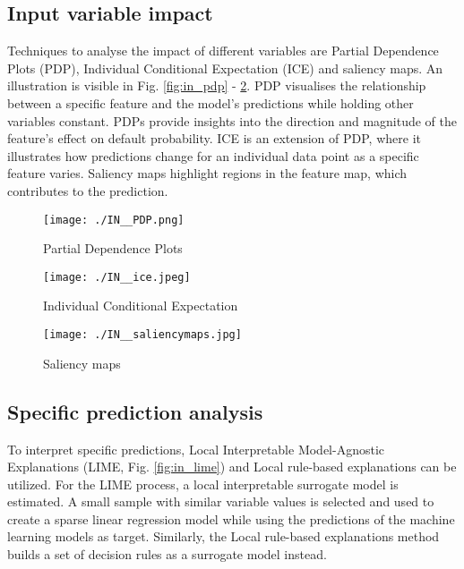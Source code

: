 \subsection{Input variable impact}
Techniques to analyse the impact of different variables are Partial Dependence Plots (PDP), Individual Conditional Expectation (ICE) and saliency maps. An illustration is visible in Fig. \ref{fig:in_pdp} - \ref{fig:in_salmaps}. PDP visualises the relationship between a specific feature and the model's predictions while holding other variables constant. PDPs provide insights into the direction and magnitude of the feature's effect on default probability. ICE is an extension of PDP, where it illustrates how predictions change for an individual data point as a specific feature varies. Saliency maps highlight regions in the feature map, which contributes to the prediction. 

\begin{figure}[H]
\begin{minipage}{.5\textwidth}
	\centering
	\texttt{[image: ./IN\_\_PDP.png]}
    \caption{Partial Dependence Plots}
    \label{fig:in_pdp}
\end{minipage}%
\begin{minipage}{.5\textwidth}
	\centering
	\texttt{[image: ./IN\_\_ice.jpeg]}
    \caption{Individual Conditional Expectation}
    \label{fig:in_ice}
\end{minipage}
\end{figure}

\begin{figure}[H]
	\centering
	\texttt{[image: ./IN\_\_saliencymaps.jpg]}
    \caption{Saliency maps}
    \label{fig:in_salmaps}
\end{figure}

\subsection{Specific prediction analysis}
To interpret specific predictions, Local Interpretable Model-Agnostic Explanations (LIME, Fig. \ref{fig:in_lime}) and Local rule-based explanations can be utilized. For the LIME process, a local interpretable surrogate model is estimated. A small sample with similar variable values is selected and used to create a sparse linear regression model while using the predictions of the machine learning models as target. Similarly, the Local rule-based explanations method builds a set of decision rules as a surrogate model instead. 

